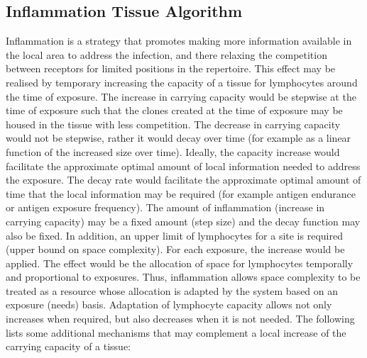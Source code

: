 \subsection{Inflammation Tissue Algorithm}
Inflammation is a strategy that promotes making more information available in the local area to address the infection, and there relaxing the competition between receptors for limited positions in the repertoire. This effect may be realised by temporary increasing the capacity of a tissue for lymphocytes around the time of exposure. The increase in carrying capacity would be stepwise at the time of exposure such that the clones created at the time of exposure may be housed in the tissue with less competition. The decrease in carrying capacity would not be stepwise, rather it would decay over time (for example as a linear function of the increased size over time). Ideally, the capacity increase would facilitate the approximate optimal amount of local information needed to address the exposure. The decay rate would facilitate the approximate optimal amount of time that the local information may be required (for example antigen endurance or antigen exposure frequency). The amount of inflammation (increase in carrying capacity) may be a fixed amount (step size) and the decay function may also be fixed. In addition, an upper limit of lymphocytes for a site is required (upper bound on space complexity). For each exposure, the increase would be applied. The effect would be the allocation of space for lymphocytes temporally and proportional to exposures. Thus, inflammation allows space complexity to be treated as a resource whose allocation is adapted by the system based on an exposure (needs) basis. Adaptation of lymphocyte capacity allows not only increases when required, but also decreases when it is not needed. The following lists some additional mechanisms that may complement a local increase of the carrying capacity of a tissue:


